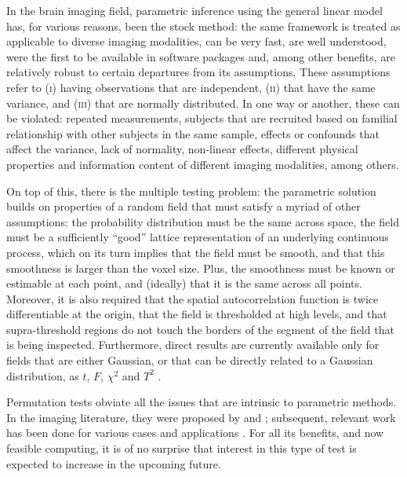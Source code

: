 In the brain imaging field, parametric inference using the general linear model \citep[\textsc{glm};][]{Scheffe1959, Searle1971, Friston1994} has, for various reasons, been the stock method: the same framework is treated as applicable to diverse imaging modalities, can be very fast, are well understood, were the first to be available in software packages and, among other benefits, are relatively robust to certain departures from its assumptions. These assumptions refer to (\textsc{i}) having observations that are independent, (\textsc{ii}) that have the same variance, and (\textsc{iii}) that are normally distributed. In one way or another, these can be violated: repeated measurements, subjects that are recruited based on familial relationship with other subjects in the same sample, effects or confounds that affect the variance, lack of normality, non-linear effects, different physical properties and information content of different imaging modalities, among others.

On top of this, there is the multiple testing problem: the parametric solution builds on properties of a random field that must satisfy a myriad of other assumptions: the probability distribution must be the same across space, the field must be a sufficiently ``good'' lattice representation of an underlying continuous process, which on its turn implies that the field must be smooth, and that this smoothness is larger than the voxel size. Plus, the smoothness must be known or estimable at each point, and (ideally) that it is the same across all points. Moreover, it is also required that the spatial autocorrelation function is twice differentiable at the origin, that the field is thresholded at high levels, and that supra-threshold regions do not touch the borders of the segment of the field that is being inspected. Furthermore, direct results are currently available only for fields that are either Gaussian, or that can be directly related to a Gaussian distribution, as $t$, $F$, $\chi^2$ and $T^2$ \citep{Worsley1996}.

Permutation tests obviate all the issues that are intrinsic to parametric methods. In the imaging literature, they were proposed by \citet{blair1994_thatcher} and \citet{Holmes1996}; subsequent, relevant work has been done for various cases and applications \citep{Arndt1996, Locascio1997, Brammer1997, Belmonte2001, Bullmore1996, Bullmore1999, Bullmore2001, Nichols2002, Breakspear2004, Laird2004, Suckling2004, Hayasaka2004, Meriaux2006, Eklund2012, Ge2012, Winkler2014, Winkler2016_npc, McFarquhar2016}. For all its benefits, and now feasible computing, it is of no surprise that interest in this type of test is expected to increase in the upcoming future.

